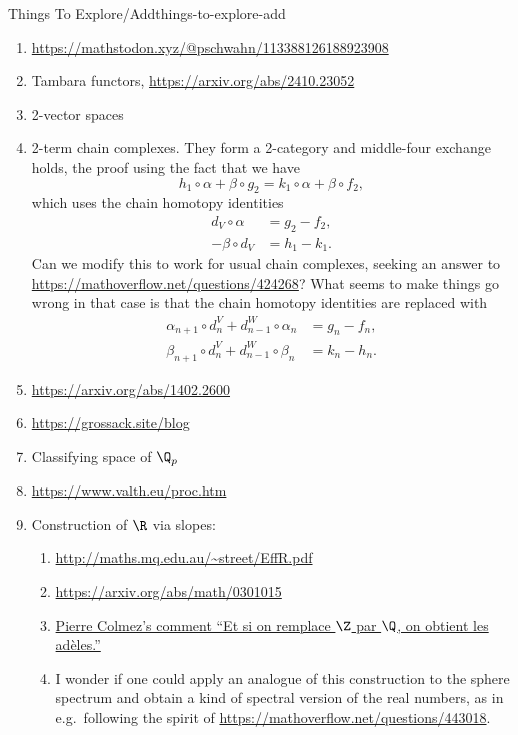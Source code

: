 \begin{remark}{Things To Explore/Add}{things-to-explore-add}
\begin{enumerate}
        \item \url{https://mathstodon.xyz/@pschwahn/113388126188923908}
        \item Tambara functors, \url{https://arxiv.org/abs/2410.23052}
        \item 2-vector spaces
        \item 2-term chain complexes. They form a 2-category and middle-four exchange holds, the proof using the fact that we have
            \[
                h_{1}\circ\alpha+\beta\circ g_{2}%
                =%
                k_{1}\circ\alpha+\beta\circ f_{2},%
            \]%
            which uses the chain homotopy identities
            \begin{align*}
                d_{V}\circ\alpha  &= g_{2}-f_{2},\\
                -\beta\circ d_{V} &= h_{1}-k_{1}.
            \end{align*}
            Can we modify this to work for usual chain complexes, seeking an answer to \url{https://mathoverflow.net/questions/424268}? What seems to make things go wrong in that case is that the chain homotopy identities are replaced with
            \begin{align*}
                \alpha_{n+1}\circ d^{V}_{n}+d^{W}_{n-1}\circ\alpha_{n} &= g_{n}-f_{n},\\
                \beta_{n+1}\circ d^{V}_{n}+d^{W}_{n-1}\circ\beta_{n}   &= k_{n}-h_{n}.
            \end{align*}
        \item \url{https://arxiv.org/abs/1402.2600}
        \item \url{https://grossack.site/blog}
        \item Classifying space of $\Q_{p}$
        \item \url{https://www.valth.eu/proc.htm}
        \item Construction of $\R$ via slopes:
            \begin{enumerate}
                \item \url{http://maths.mq.edu.au/~street/EffR.pdf}
                \item \url{https://arxiv.org/abs/math/0301015}
                \item \href{https://twitter.com/ColmezPierre/status/1809308351643165181?t=KAESWH44ufE7486diGcxrA}{Pierre Colmez's comment ``Et si on remplace $\Z$ par $\Q$, on obtient les adèles.''}
                \item I wonder if one could apply an analogue of this construction to the sphere spectrum and obtain a kind of spectral version of the real numbers, as in e.g.\ following the spirit of \href{MO 443018}{https://mathoverflow.net/questions/443018}.

\end{enumerate}
\end{enumerate}
\end{remark}
